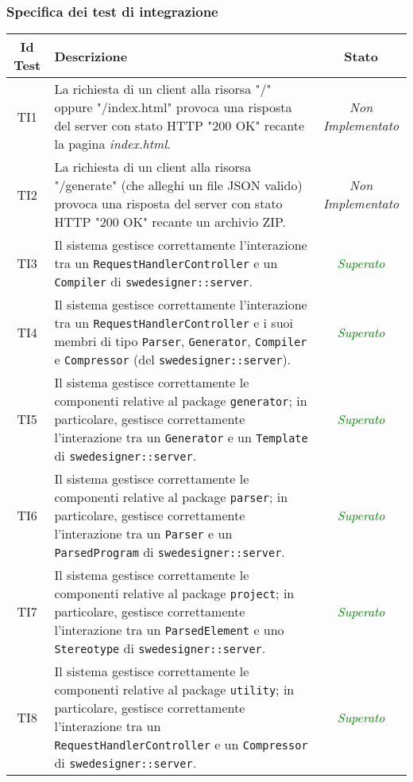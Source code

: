 \subsubsection{Specifica dei test di integrazione}
\normalsize
\begin{longtable}{|c|>{}m{8cm}|c|}
\hline
\textbf{Id Test} & \textbf{Descrizione} & \textbf{Stato}\\
\hline
\endhead
\hypertarget{TI1}{TI1} & La richiesta di un client alla risorsa "/" oppure "/index.html" provoca una risposta del server con stato HTTP "200 OK" recante la pagina \emph{index.html}. & \textit{Non Implementato}\\ \hline
\hypertarget{TI2}{TI2} & La richiesta di un client alla risorsa "/generate" (che alleghi un file JSON valido) provoca una risposta del server con stato HTTP "200 OK" recante un archivio ZIP. & \textit{Non Implementato}\\ \hline
\hypertarget{TI3}{TI3} & Il sistema gestisce correttamente l'interazione tra un \texttt{RequestHandlerController} e un \texttt{Compiler} di \texttt{swedesigner::server}. & \textcolor{Green}{\textit{Superato}}\\ \hline
\hypertarget{TI4}{TI4} & Il sistema gestisce correttamente l'interazione tra un \texttt{RequestHandlerController} e i suoi membri di tipo \texttt{Parser}, \texttt{Generator}, \texttt{Compiler} e \texttt{Compressor} (del \texttt{swedesigner::server}). & \textcolor{Green}{\textit{Superato}}\\ \hline
\hypertarget{TI5}{TI5} & Il sistema gestisce correttamente le componenti relative al package \texttt{generator}; in particolare, gestisce correttamente l'interazione tra un \texttt{Generator} e un \texttt{Template} di \texttt{swedesigner::server}. & \textcolor{Green}{\textit{Superato}}\\ \hline
\hypertarget{TI6}{TI6} & Il sistema gestisce correttamente le componenti relative al package \texttt{parser}; in particolare, gestisce correttamente l'interazione tra un \texttt{Parser} e un \texttt{ParsedProgram} di \texttt{swedesigner::server}. & \textcolor{Green}{\textit{Superato}}\\ \hline
\hypertarget{TI7}{TI7} & Il sistema gestisce correttamente le componenti relative al package \texttt{project}; in particolare, gestisce correttamente l'interazione tra un \texttt{ParsedElement} e uno \texttt{Stereotype} di \texttt{swedesigner::server}. & \textcolor{Green}{\textit{Superato}}\\ \hline
\hypertarget{TI8}{TI8} & Il sistema gestisce correttamente le componenti relative al package \texttt{utility}; in particolare, gestisce correttamente l'interazione tra un \texttt{RequestHandlerController} e un \texttt{Compressor} di \texttt{swedesigner::server}. & \textcolor{Green}{\textit{Superato}}\\ \hline

\end{longtable}
